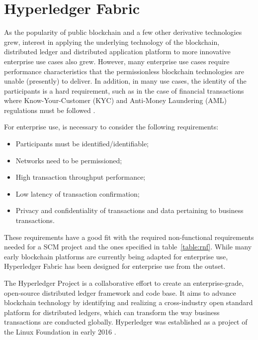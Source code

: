 \section{Hyperledger Fabric}\label{sec:hyperledger}

As the popularity of public blockchain and a few other derivative technologies grew, interest in applying the underlying technology of the blockchain, distributed ledger and distributed application platform to more innovative enterprise use cases also grew. However, many enterprise use cases require performance characteristics that the permissionless blockchain technologies are unable (presently) to deliver. In addition, in many use cases, the identity of the participants is a hard requirement, such as in the case of financial transactions where Know-Your-Customer (KYC) and Anti-Money Laundering (AML) regulations must be followed \cite{POLGE2020}.

For enterprise use, is necessary to consider the following requirements:

\begin{itemize}
\item Participants must be identified/identifiable;
\item Networks need to be permissioned;
\item High transaction throughput performance;
\item Low latency of transaction confirmation;
\item Privacy and confidentiality of transactions and data pertaining to business transactions.
\end{itemize}

These requirements have a good fit with the required non-functional requirements needed for a SCM project and the ones specified in table~\ref{table:rnf}. While many early blockchain platforms are currently being adapted for enterprise use, Hyperledger Fabric has been designed for enterprise use from the outset. 

The Hyperledger Project is a collaborative effort to create an enterprise-grade, open-source distributed ledger framework and code base. It aims to advance blockchain technology by identifying and realizing a cross-industry open standard platform for distributed ledgers, which can transform the way business transactions are conducted globally. Hyperledger was established as a project of the Linux Foundation in early 2016 \cite{cachin2016architecture}.


